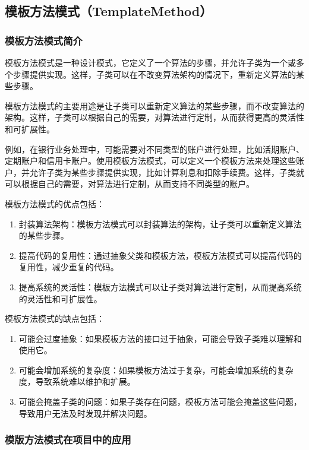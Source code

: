 \subsection{模板方法模式（TemplateMethod）}

\subsubsection{模板方法模式简介}

模板方法模式是一种设计模式，它定义了一个算法的步骤，并允许子类为一个或多个步骤提供实现。这样，子类可以在不改变算法架构的情况下，重新定义算法的某些步骤。

模板方法模式的主要用途是让子类可以重新定义算法的某些步骤，而不改变算法的架构。这样，子类可以根据自己的需要，对算法进行定制，从而获得更高的灵活性和可扩展性。

例如，在银行业务处理中，可能需要对不同类型的账户进行处理，比如活期账户、定期账户和信用卡账户。使用模板方法模式，可以定义一个模板方法来处理这些账户，并允许子类为某些步骤提供实现，比如计算利息和扣除手续费。这样，子类就可以根据自己的需要，对算法进行定制，从而支持不同类型的账户。

模板方法模式的优点包括：
\begin{enumerate}
    \item 封装算法架构：模板方法模式可以封装算法的架构，让子类可以重新定义算法的某些步骤。
    \item 提高代码的复用性：通过抽象父类和模板方法，模板方法模式可以提高代码的复用性，减少重复的代码。
    \item 提高系统的灵活性：模板方法模式可以让子类对算法进行定制，从而提高系统的灵活性和可扩展性。
\end{enumerate}

模板方法模式的缺点包括：
\begin{enumerate}
    \item 可能会过度抽象：如果模板方法的接口过于抽象，可能会导致子类难以理解和使用它。
    \item 可能会增加系统的复杂度：如果模板方法过于复杂，可能会增加系统的复杂度，导致系统难以维护和扩展。
    \item 可能会掩盖子类的问题：如果子类存在问题，模板方法可能会掩盖这些问题，导致用户无法及时发现并解决问题。
\end{enumerate}

\subsubsection{模版方法模式在项目中的应用}

